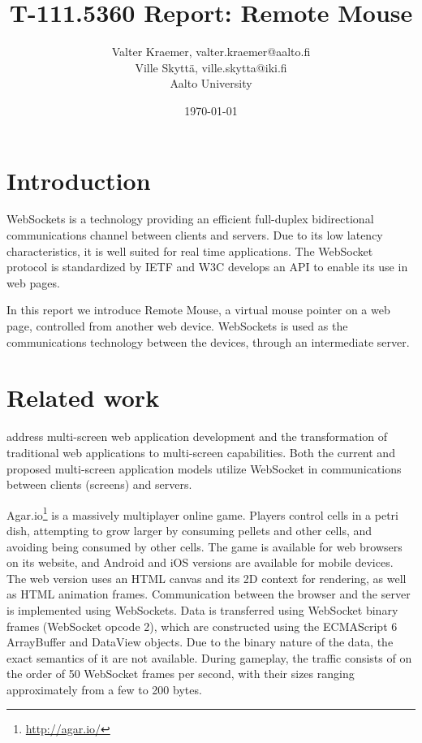 \documentclass[a4paper,english,twocolumn]{article}
\begin{document}
\title{T-111.5360 Report: Remote Mouse}

\author{Valter Kraemer, valter.kraemer@aalto.fi\\Ville Skyttä, ville.skytta@iki.fi\\Aalto University}

\date{\today}

\maketitle


\section{Introduction}

WebSockets is a technology providing an efficient full-duplex
bidirectional communications channel between clients and servers. Due
to its low latency characteristics, it is well suited for real time
applications. The WebSocket protocol is standardized by IETF
\citep{rfc} and W3C \citep{w3c} develops an API to enable its use in
web pages.

In this report we introduce Remote Mouse, a virtual mouse pointer on a
web page, controlled from another web device. WebSockets is used as
the communications technology between the devices, through an
intermediate server.

\section{Related work}

\citet{bassbouss} address multi-screen web application development and
the transformation of traditional web applications to multi-screen
capabilities. Both the current and proposed multi-screen application
models utilize WebSocket in communications between clients (screens)
and servers.

Agar.io\footnote{\url{http://agar.io/}} is a massively multiplayer
online game. Players control cells in a petri dish, attempting to grow
larger by consuming pellets and other cells, and avoiding being
consumed by other cells. The game is available for web browsers on its
website, and Android and iOS versions are available for mobile
devices. The web version uses an HTML canvas and its 2D context for
rendering, as well as HTML animation frames. Communication between the
browser and the server is implemented using WebSockets. Data is
transferred using WebSocket binary frames (WebSocket opcode 2), which
are constructed using the ECMAScript 6 ArrayBuffer and DataView
objects. Due to the binary nature of the data, the exact semantics of
it are not available. During gameplay, the traffic consists of on the
order of 50 WebSocket frames per second, with their sizes ranging
approximately from a few to 200 bytes.
\end{document}
